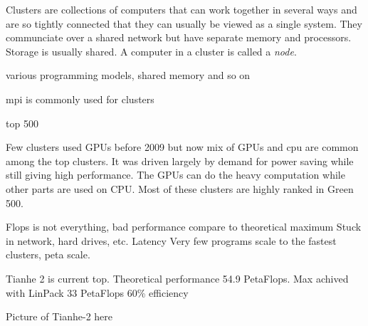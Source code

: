 \documentclass[10pt,a4paper]{report}
\begin{document}
Clusters are collections of computers that can work together in several ways and are so tightly connected that they can usually be viewed as a single system. They communciate over a shared network but have separate memory and processors. Storage is usually shared. A computer in a cluster is called a \emph{node}. \cite{intro_hpc, kirk2012programming}

various programming models, shared memory and so on

mpi is commonly used for clusters\cite{kirk2012programming}

top 500\cite{TOP500}

Few clusters used GPUs before 2009 but now mix of GPUs and cpu are common among the top clusters. It was driven largely by demand for power saving while still giving high performance. The GPUs can do the heavy computation while other parts are used on CPU. Most of these clusters are highly ranked in Green 500. \cite{kirk2012programming}

Flops is not everything, bad performance compare to theoretical maximum
Stuck in network, hard drives, etc. Latency
Very few programs scale to the fastest clusters, peta scale.

Tianhe 2 is current top. Theoretical performance 54.9 PetaFlops.\cite{TOP500}
Max achived with LinPack 33 PetaFlops
60\% efficiency

Picture of Tianhe-2 here

\cite{introduction_hpc_hager}

\clearpage
\end{document}
